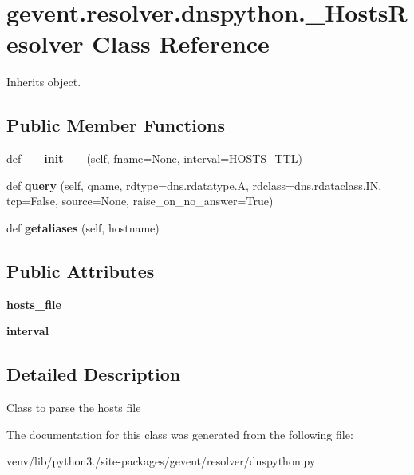 \hypertarget{classgevent_1_1resolver_1_1dnspython_1_1___hosts_resolver}{}\section{gevent.\+resolver.\+dnspython.\+\_\+\+Hosts\+Resolver Class Reference}
\label{classgevent_1_1resolver_1_1dnspython_1_1___hosts_resolver}


Inherits object.

\subsection*{Public Member Functions}
\begin{DoxyCompactItemize}
\item 
\mbox{\label{classgevent_1_1resolver_1_1dnspython_1_1___hosts_resolver_a08ac04a05355a7cc70da607b425fbc38}} 
def {\bfseries \+\_\+\+\_\+init\+\_\+\+\_\+} (self, fname=None, interval=H\+O\+S\+T\+S\+\_\+\+T\+TL)
\item 
\mbox{\label{classgevent_1_1resolver_1_1dnspython_1_1___hosts_resolver_a59d6182ad415d19d7669fdc6e940be8a}} 
def {\bfseries query} (self, qname, rdtype=dns.\+rdatatype.\+A, rdclass=dns.\+rdataclass.\+IN, tcp=False, source=None, raise\+\_\+on\+\_\+no\+\_\+answer=True)
\item 
\mbox{\label{classgevent_1_1resolver_1_1dnspython_1_1___hosts_resolver_a352f782721a5d633491d4ef363e91e75}} 
def {\bfseries getaliases} (self, hostname)
\end{DoxyCompactItemize}
\subsection*{Public Attributes}
\begin{DoxyCompactItemize}
\item 
\mbox{\label{classgevent_1_1resolver_1_1dnspython_1_1___hosts_resolver_a919219cfbd2163fb03c756b98bfab101}} 
{\bfseries hosts\+\_\+file}
\item 
\mbox{\label{classgevent_1_1resolver_1_1dnspython_1_1___hosts_resolver_a41b26f0914e314d653735b7bbded0534}} 
{\bfseries interval}
\end{DoxyCompactItemize}


\subsection{Detailed Description}
\begin{DoxyVerb}Class to parse the hosts file
\end{DoxyVerb}
 

The documentation for this class was generated from the following file\+:\begin{DoxyCompactItemize}
\item 
venv/lib/python3./site-\/packages/gevent/resolver/dnspython.\+py\end{DoxyCompactItemize}
